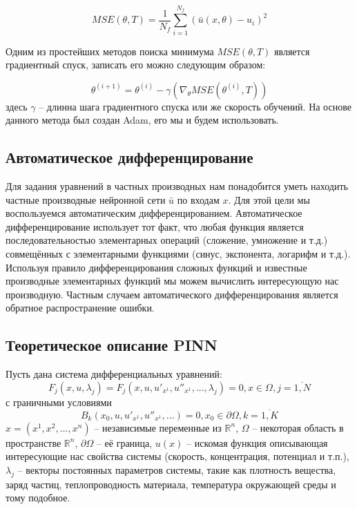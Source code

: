 \documentclass[a4paper,14pt]{extarticle} %
\begin{document}
\begin{equation}
    MSE(\theta, T) = \frac{1}{N_f}\sum_{i=1}^{N_f}(\bar{u}(x, \theta)-u_i)^2
\end{equation}

Одним из простейших методов поиска минимума $MSE(\theta, T)$ является градиентный спуск, записать его можно следующим образом:

\begin{equation}
    \theta^{(i+1)} = \theta^{(i)} - \gamma(\nabla_\theta MSE(\theta^{(i)}, T))
\end{equation}
здесь $\gamma$ -- длинна шага градиентного спуска или же скорость обучений. На основе данного метода был создан Adam, его мы и будем использовать.

\subsection{Автоматическое дифференцирование}

Для задания уравнений в частных производных нам понадобится уметь находить частные производные нейронной сети $\bar{u}$ по входам $x$. Для этой цели мы воспользуемся автоматическим дифференцированием. Автоматическое дифференцирование использует тот факт, что любая функция является последовательностью элементарных операций (сложение, умножение и т.д.) совмещённых с элементарными функциями (синус, экспонента, логарифм и т.д.). Используя правило дифференцирования сложных функций и известные производные элементарных функций мы можем вычислить интересующую нас производную. Частным случаем автоматического дифференцирования является обратное распространение ошибки.

\subsection{Теоретическое описание PINN}

Пусть дана система дифференциальных уравнений:
\begin{equation}\label{eq:1syst}
    F_j(x, u, \lambda_j) = F_j(x, u, u'_{x^1}, u''_{x^1}, ..., \lambda_j) = 0, x\in\Omega, j=\overline{1,N}
\end{equation}
с граничными условиями
\begin{equation}\label{eq:1bnd}
    B_k(x_0, u, u'_{x^1}, u''_{x^1}, ...) = 0, x_0 \in \partial\Omega, k=\overline{1,K}
\end{equation}
$x = (x^1, x^2, ... ,x^n)$ -- независимые переменные из $\mathbb{R}^n$, $\Omega$ -- некоторая область в пространстве $\mathbb{R}^n$, $\partial\Omega$ -- её граница, $u(x)$ -- искомая функция описывающая интересующие нас свойства системы (скорость, концентрация, потенциал и т.п.), $\lambda_j$ -- векторы постоянных параметров системы, такие как плотность вещества, заряд частиц, теплопроводность материала, температура окружающей среды и тому подобное.
\end{document}
